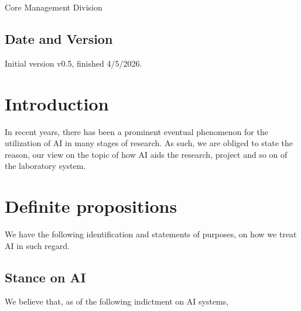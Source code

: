 \documentclass[10pt,a4paper]{article}
\begin{document}
Core Management Division

\subsection{Date and Version}


Initial version v0.5, finished 4/5/2026. 

\section{Introduction}

In recent years, there has been a prominent eventual phenomenon for the utilization of AI in many stages of research. As such, we are obliged to state the reason, our view on the topic of how AI aids the research, project and so on of the laboratory system. 

\section{Definite propositions}

We have the following identification and statements of purposes, on how we treat AI in such regard. 

\subsection{Stance on AI}

We believe that, as of the following indictment on AI systems, 
\end{document}
